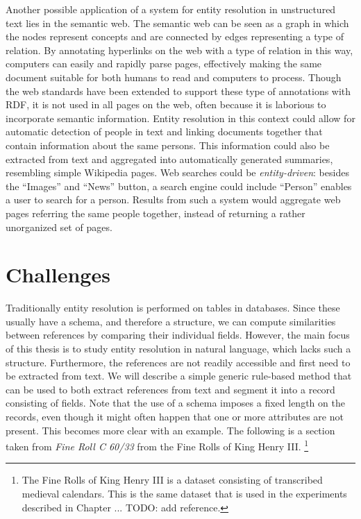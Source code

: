 Another possible application of a system for entity resolution in unstructured text lies in the semantic web.
The semantic web can be seen as a graph in which the nodes represent concepts and are connected by edges representing a type of relation.
By annotating hyperlinks on the web with a type of relation in this way, computers can easily and rapidly parse pages, effectively making the same document suitable for both humans to read and computers to process.
Though the web standards have been extended to support these type of annotations with RDF, it is not used in all pages on the web, often because it is laborious to incorporate semantic information.
Entity resolution in this context could allow for automatic detection of people in text and linking documents together that contain information about the same persons.
This information could also be extracted from text and aggregated into automatically generated summaries, resembling simple Wikipedia pages.
Web searches could be \emph{entity-driven}: besides the ``Images'' and ``News'' button, a search engine could include ``Person'' enables a user to search for a person.
Results from such a system would aggregate web pages referring the same people together, instead of returning a rather unorganized set of pages.




\section{Challenges}
\label{sec:challenges}

Traditionally entity resolution is performed on tables in databases.
Since these usually have a schema, and therefore a structure, we can compute similarities between references by comparing their individual fields.
However, the main focus of this thesis is to study entity resolution in natural language, which lacks such a structure.
Furthermore, the references are not readily accessible and first need to be extracted from text.
We will describe a simple generic rule-based method that can be used to both extract references from text and segment it into a record consisting of fields.
Note that the use of a schema imposes a fixed length on the records, even though it might often happen that one or more attributes are not present.
This becomes more clear with an example.
The following is a section taken from \emph{Fine Roll C 60/33} from the Fine Rolls of King Henry III. \footnote{The Fine Rolls of King Henry III is a dataset consisting of transcribed medieval calendars. This is the same dataset that is used in the experiments described in Chapter ... TODO: add reference.}

